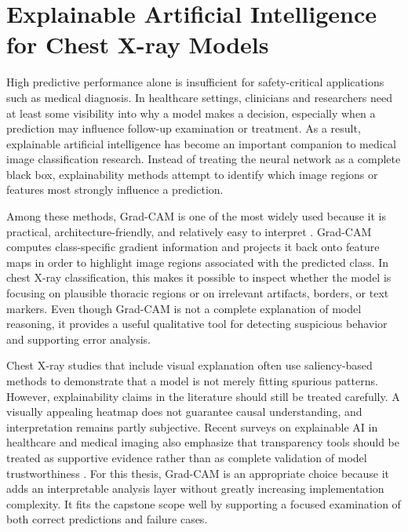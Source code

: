 \section{Explainable Artificial Intelligence for Chest X-ray Models}
High predictive performance alone is insufficient for safety-critical applications such as medical diagnosis. In healthcare settings, clinicians and researchers need at least some visibility into why a model makes a decision, especially when a prediction may influence follow-up examination or treatment. As a result, explainable artificial intelligence has become an important companion to medical image classification research. Instead of treating the neural network as a complete black box, explainability methods attempt to identify which image regions or features most strongly influence a prediction.

Among these methods, Grad-CAM is one of the most widely used because it is practical, architecture-friendly, and relatively easy to interpret \cite{ref:selvaraju2017}. Grad-CAM computes class-specific gradient information and projects it back onto feature maps in order to highlight image regions associated with the predicted class. In chest X-ray classification, this makes it possible to inspect whether the model is focusing on plausible thoracic regions or on irrelevant artifacts, borders, or text markers. Even though Grad-CAM is not a complete explanation of model reasoning, it provides a useful qualitative tool for detecting suspicious behavior and supporting error analysis.

Chest X-ray studies that include visual explanation often use saliency-based methods to demonstrate that a model is not merely fitting spurious patterns. However, explainability claims in the literature should still be treated carefully. A visually appealing heatmap does not guarantee causal understanding, and interpretation remains partly subjective. Recent surveys on explainable AI in healthcare and medical imaging also emphasize that transparency tools should be treated as supportive evidence rather than as complete validation of model trustworthiness \cite{ref:chaddad2023,ref:bhati2024}. For this thesis, Grad-CAM is an appropriate choice because it adds an interpretable analysis layer without greatly increasing implementation complexity. It fits the capstone scope well by supporting a focused examination of both correct predictions and failure cases.

